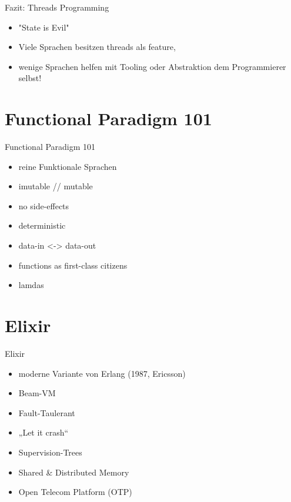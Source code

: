 \documentclass[compress]{beamer}
\begin{document}
  \begin{frame}{Fazit: Threads Programming}
    \begin{itemize}
      \item "State is Evil"
      \item Viele Sprachen besitzen threads als feature,
      \item wenige Sprachen helfen mit Tooling oder Abstraktion dem Programmierer selbst!
    \end{itemize}
  \end{frame}

\section{Functional Paradigm 101}
  \begin{frame}{Functional Paradigm 101}
    \begin{itemize}
      \item reine Funktionale Sprachen
      \item imutable // mutable
      \item no side-effects
      \item deterministic
      \item data-in <-> data-out
      \item functions as first-class citizens
      \item lamdas
    \end{itemize}
  \end{frame}

\section{Elixir}
  \begin{frame}{Elixir}
    \begin{itemize}
      \item moderne Variante von Erlang (1987, Ericsson)
      \item Beam-VM
      \item Fault-Taulerant
      \item „Let it crash“
      \item Supervision-Trees
      \item Shared \& Distributed Memory
      \item Open Telecom Platform (OTP)
    \end{itemize}
  \end{frame}
\end{document}
